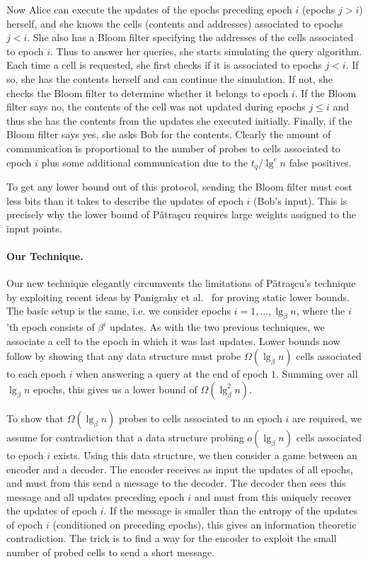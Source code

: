 \documentclass[letterpaper]{article}
\begin{document}
Now Alice can execute the updates of the epochs preceding epoch $i$
(epochs $j>i$) herself, and she knows the cells (contents and
addresses) associated to epochs $j<i$. She also has a Bloom filter
specifying the addresses of the cells associated to epoch $i$. Thus to
answer her queries, she starts simulating the query algorithm. Each
time a cell is requested, she first checks if it is associated to
epochs $j<i$. If so, she has the contents herself and can continue the
simulation. If not, she checks the Bloom filter to determine whether
it belongs to epoch $i$. If the Bloom filter says no, the contents of
the cell was not updated during epochs $j \leq i$ and thus she has the
contents from the updates she executed initially. Finally, if the
Bloom filter says yes, she asks Bob for the contents. Clearly the
amount of communication is proportional to the number of probes to
cells associated to epoch $i$ plus some additional communication due
to the $t_q/\lg^cn$ false positives.

To get any lower bound out of this protocol, sending the Bloom filter
must cost less bits than it takes to describe the updates of epoch $i$
(Bob's input). This is precisely why the lower bound of P{\v a}tra{\c
  s}cu requires large weights assigned to the input points.

\paragraph{Our Technique.}
Our new technique elegantly circumvents the limitations of P{\v
  a}tra{\c s}cu's technique by exploiting recent ideas by Panigrahy et
al.~\cite{pani:metric} for proving static lower bounds. The basic
setup is the same, i.e. we consider epochs $i=1,\dots,\lg_\beta n$,
where the $i$'th epoch consists of $\beta^i$ updates. As with the two
previous techniques, we associate a cell to the epoch in which it was
last updates. Lower bounds now follow by showing that any data
structure must probe $\Omega(\lg_\beta n)$ cells associated to each
epoch $i$ when answering a query at the end of epoch $1$. Summing over
all $\lg_\beta n$ epochs, this gives us a lower bound of
$\Omega(\lg_\beta^2n)$.

To show that $\Omega(\lg_\beta n)$ probes to cells associated to an
epoch $i$ are required, we assume for contradiction that a data
structure probing $o(\lg_\beta n)$ cells associated to epoch $i$
exists. Using this data structure, we then consider a game between an
encoder and a decoder. The encoder receives as input the updates of
all epochs, and must from this send a message to the decoder. The
decoder then sees this message and all updates preceding epoch $i$
and must from this uniquely recover the updates of epoch $i$. If the
message is smaller than the entropy of the updates of epoch $i$ (conditioned on preceding epochs), this
gives an information theoretic contradiction. The trick is to find a
way for the encoder to exploit the small number of probed cells to
send a short message. 
\end{document}
